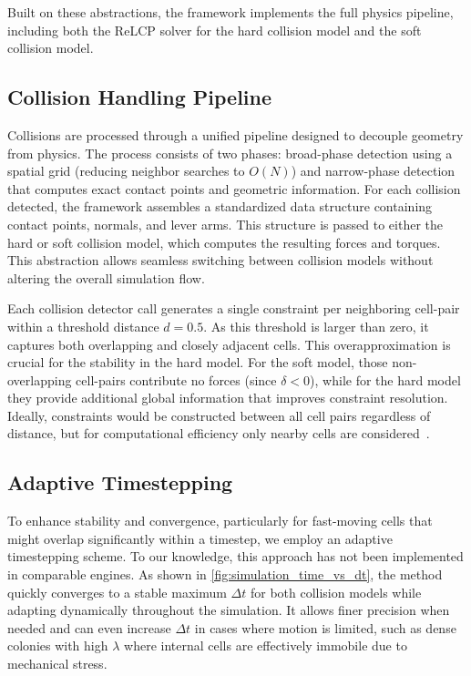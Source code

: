 \documentclass[conference]{IEEEtran}
\begin{document}
Built on these abstractions, the framework implements the full physics pipeline, including both the ReLCP solver for the hard collision model and the soft collision model.

\subsection{Collision Handling Pipeline}

Collisions are processed through a unified pipeline designed to decouple geometry from physics. The process consists of two phases: broad-phase detection using a spatial grid (reducing neighbor searches to $O(N)$) and narrow-phase detection that computes exact contact points and geometric information. For each collision detected, the framework assembles a standardized data structure containing contact points, normals, and lever arms. This structure is passed to either the hard or soft collision model, which computes the resulting forces and torques. This abstraction allows seamless switching between collision models without altering the overall simulation flow.

Each collision detector call generates a single constraint per neighboring cell-pair within a threshold distance $d = 0.5$. As this threshold is larger than zero, it captures both overlapping and closely adjacent cells. This overapproximation is crucial for the stability in the hard model. For the soft model, those non-overlapping cell-pairs contribute no forces (since $\delta < 0$), while for the hard model they provide additional global information that improves constraint resolution. Ideally, constraints would be constructed between all cell pairs regardless of distance, but for computational efficiency only nearby cells are considered~\cite{Yan2019, Yan2022}.

\subsection{Adaptive Timestepping}

To enhance stability and convergence, particularly for fast-moving cells that might overlap significantly within a timestep, we employ an adaptive timestepping scheme. To our knowledge, this approach has not been implemented in comparable engines. As shown in \autoref{fig:simulation_time_vs_dt}, the method quickly converges to a stable maximum $\Delta t$ for both collision models while adapting dynamically throughout the simulation. It allows finer precision when needed and can even increase $\Delta t$ in cases where motion is limited, such as dense colonies with high $\lambda$ where internal cells are effectively immobile due to mechanical stress.
\end{document}
